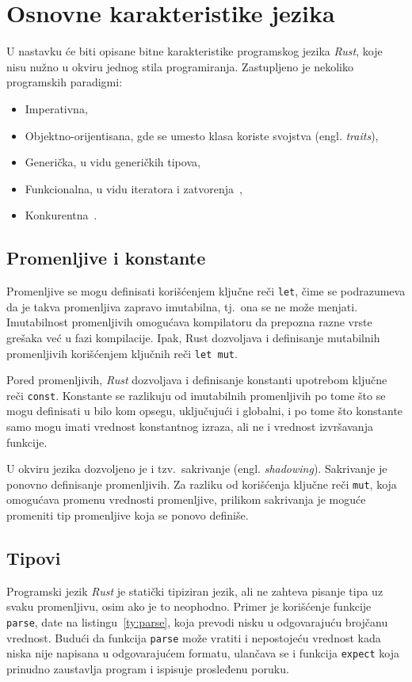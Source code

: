 \documentclass[12pt,oneside]{memoir}
\begin{document}
\section{Osnovne karakteristike jezika}
U nastavku će biti opisane bitne karakteristike programskog jezika \emph{Rust}, koje nisu nužno
u okviru jednog stila programiranja. Zastupljeno je nekoliko programskih paradigmi:

\begin{itemize}
    \item Imperativna,
    \item Objektno-orijentisana, gde se umesto klasa koriste svojstva (engl. \emph{traits}),
    \item Generička, u vidu generičkih tipova,
    \item Funkcionalna, u vidu iteratora i zatvorenja~\cite{functional_rust},
    \item Konkurentna~\cite{concurrent_rust}.
\end{itemize}

\subsection{Promenljive i konstante}
Promenljive se mogu definisati korišćenjem ključne reči \texttt{let}, čime se podrazumeva da
je takva promenljiva zapravo imutabilna, tj.\ ona se ne može menjati. Imutabilnost
promenljivih omogućava kompilatoru da prepozna razne vrste grešaka već u fazi kompilacije.
Ipak, Rust dozvoljava i definisanje mutabilnih promenljivih korišćenjem ključnih reči \texttt{let mut}.

Pored promenljivih, \emph{Rust} dozvoljava i definisanje konstanti
upotrebom ključne reči \texttt{const}.
Konstante se razlikuju od imutabilnih promenljivih po tome što se
mogu definisati u bilo kom opsegu, uključujući i globalni, i po
tome što konstante samo mogu imati vrednost konstantnog izraza,
ali ne i vrednost izvršavanja funkcije.

U okviru jezika dozvoljeno je i tzv.\ sakrivanje (engl. \emph{shadowing}).
Sakrivanje je ponovno definisanje promenljivih. Za razliku od
korišćenja ključne reči \texttt{mut}, koja omogućava promenu vrednosti promenljive, prilikom sakrivanja je
moguće promeniti tip promenljive koja se ponovo definiše.

\subsection{Tipovi}
Programski jezik \emph{Rust} je statički tipiziran jezik, ali
ne zahteva pisanje tipa uz svaku promenljivu, osim ako je to
neophodno. Primer je korišćenje funkcije \texttt{parse}, date na listingu~\ref{ty:parse},
koja prevodi nisku u odgovarajuću brojčanu vrednost. Budući da funkcija
\texttt{parse} može vratiti i nepostojeću vrednost kada niska nije napisana
u odgovarajućem formatu, ulančava se i funkcija \texttt{expect} koja
prinudno zaustavlja program i ispisuje prosleđenu poruku.
\end{document}
